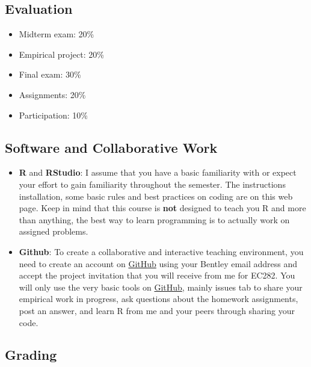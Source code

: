 \documentclass[
]{book}
\providecommand{\tightlist}{%
  \setlength{\itemsep}{0pt}\setlength{\parskip}{0pt}}
\begin{document}
\hypertarget{evaluation}{%
\subsection*{Evaluation}\label{evaluation}}

\begin{itemize}
\tightlist
\item
  Midterm exam: 20\%
\item
  Empirical project: 20\%
\item
  Final exam: 30\%
\item
  Assignments: 20\%
\item
  Participation: 10\%
\end{itemize}

\hypertarget{software-and-collaborative-work}{%
\subsection*{Software and Collaborative Work}\label{software-and-collaborative-work}}

\begin{itemize}
\item
  \textbf{R} and \textbf{RStudio}: I assume that you have a basic familiarity with or expect your effort to gain familiarity throughout the semester. The instructions installation, some basic rules and best practices on coding are on this web page. Keep in mind that this course is \textbf{not} designed to teach you R and more than anything, the best way to learn programming is to actually work on assigned problems.
\item
  \textbf{Github}: To create a collaborative and interactive teaching environment, you need to create an account on \href{https://github.com/}{GitHub} using your Bentley email address and accept the project invitation that you will receive from me for EC282. You will only use the very basic tools on \href{https://github.com/}{GitHub}, mainly issues tab to share your empirical work in progress, ask questions about the homework assignments, post an answer, and learn R from me and your peers through sharing your code.
\end{itemize}

\hypertarget{grading}{%
\subsection*{Grading}\label{grading}}
\end{document}
